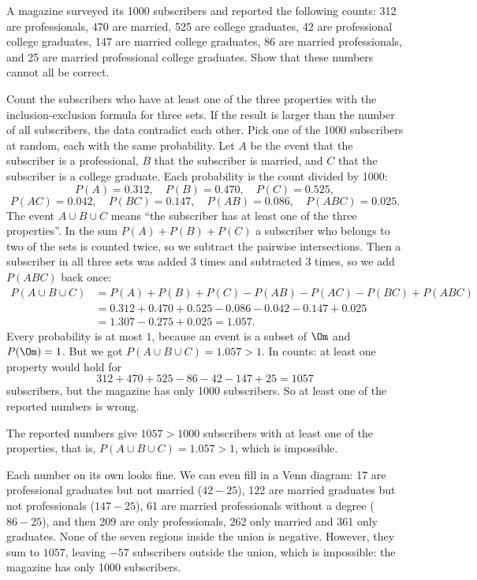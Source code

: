 
\begin{problem}
	A magazine surveyed its 1000 subscribers and reported the following counts:
	312 are professionals, 470 are married, 525 are college graduates,
	42 are professional college graduates, 147 are married college graduates,
	86 are married professionals, and 25 are married professional college
	graduates. Show that these numbers cannot all be correct.
\end{problem}

\begin{solution}
	\idea Count the subscribers who have at least one of the three properties
	with the inclusion-exclusion formula for three sets. If the result is
	larger than the number of all subscribers, the data contradict each other.
	 Pick one of the 1000 subscribers at random, each with the same
	probability. Let $A$ be the event that the subscriber is a professional,
	$B$ that the subscriber is married, and $C$ that the subscriber is a college
	graduate. Each probability is the count divided by 1000:
	\[
		P(A)=0.312,\quad P(B)=0.470,\quad P(C)=0.525,
	\]
	\[
		P(AC)=0.042,\quad P(BC)=0.147,\quad P(AB)=0.086,\quad P(ABC)=0.025.
	\]
	 The event $A\cup B\cup C$ means ``the subscriber
	has at least one of the three properties''. In the sum
	$P(A)+P(B)+P(C)$ a subscriber who belongs to two of the sets is counted
	twice, so we subtract the pairwise intersections. Then a subscriber in all
	three sets was added 3 times and subtracted 3 times, so we add $P(ABC)$
	back once:
	\[
		\begin{aligned}
			P(A\cup B\cup C)
			&=P(A)+P(B)+P(C)-P(AB)-P(AC)-P(BC)+P(ABC)\\
			&=0.312+0.470+0.525-0.086-0.042-0.147+0.025\\
			&=1.307-0.275+0.025=1.057.
		\end{aligned}
	\]
	 Every probability is at most $1$, because an event is
	a subset of $\Om$ and $P(\Om)=1$. But we got $P(A\cup B\cup C)=1.057>1$.
	In counts: at least one property would hold for
	\[
		312+470+525-86-42-147+25=1057
	\]
	subscribers, but the magazine has only 1000 subscribers. So at least one
	of the reported numbers is wrong.
	\begin{answer}
		The reported numbers give $1057>1000$ subscribers with at least one of
		the properties, that is, $P(A\cup B\cup C)=1.057>1$, which is
		impossible.
	\end{answer}
	\begin{remark}
		Each number on its own looks fine. We can even fill in a Venn diagram:
		17 are professional graduates but not married ($42-25$), 122 are married
		graduates but not professionals ($147-25$), 61 are married professionals
		without a degree ($86-25$), and then 209 are only professionals, 262
		only married and 361 only graduates. None of the seven regions inside
		the union is negative. However, they sum to $1057$, leaving $-57$
		subscribers outside the union, which is impossible: the magazine has
		only 1000 subscribers.
	\end{remark}
\end{solution}
